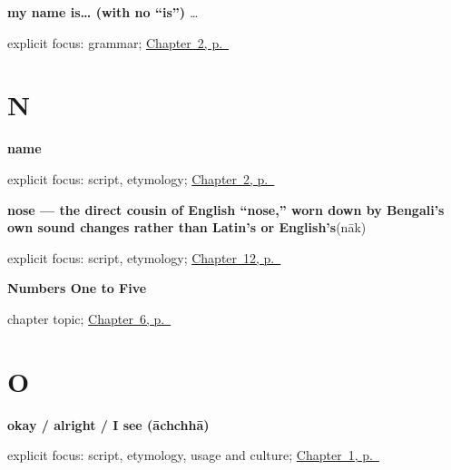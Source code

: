 \noindent\begin{minipage}[t]{\linewidth}
\raggedright
\textbf{my name is… (with no \textquotedblleft{}is\textquotedblright{})}\enspace\emph{  …}\par
\footnotesize explicit focus: grammar; \hyperref[ch:introductions]{Chapter~2, p.~\pageref*{ch:introductions}}
\end{minipage}\par\smallskip

\section*{N}

\noindent\begin{minipage}[t]{\linewidth}
\raggedright
\textbf{name}\enspace\emph{}\par
\footnotesize explicit focus: script, etymology; \hyperref[ch:introductions]{Chapter~2, p.~\pageref*{ch:introductions}}
\end{minipage}\par\smallskip

\noindent\begin{minipage}[t]{\linewidth}
\raggedright
\textbf{nose — the direct cousin of English \textquotedblleft{}nose,\textquotedblright{} worn down by Bengali's own sound changes rather than Latin's or English's}\enspace\emph{}\enspace(nāk)\par
\footnotesize explicit focus: script, etymology; \hyperref[ch:bn-eye-mouth-nose-heart]{Chapter~12, p.~\pageref*{ch:bn-eye-mouth-nose-heart}}
\end{minipage}\par\smallskip

\noindent\begin{minipage}[t]{\linewidth}
\raggedright
\textbf{Numbers One to Five}\par
\footnotesize chapter topic; \hyperref[ch:numbers-one-to-five]{Chapter~6, p.~\pageref*{ch:numbers-one-to-five}}
\end{minipage}\par\smallskip

\section*{O}

\noindent\begin{minipage}[t]{\linewidth}
\raggedright
\textbf{okay / alright / I see (āchchhā)}\enspace\emph{}\par
\footnotesize explicit focus: script, etymology, usage and culture; \hyperref[ch:greetings]{Chapter~1, p.~\pageref*{ch:greetings}}
\end{minipage}\par\smallskip

